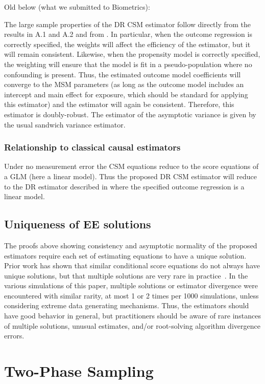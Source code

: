\documentclass[12pt]{article}
\begin{document}
Old below (what we submitted to Biometrics):

The large sample properties of the DR CSM estimator follow directly from the results in A.1 and A.2 and from \citet{kang2007}. In particular, when the outcome regression is correctly specified, the weights will affect the efficiency of the estimator, but it will remain consistent. Likewise, when the propensity model is correctly specified, the weighting will ensure that the model is fit in a pseudo-population where no confounding is present. Thus, the estimated outcome model coefficients will converge to the MSM parameters (as long as the outcome model includes an intercept and main effect for exposure, which should be standard for applying this estimator) and the estimator will again be consistent. Therefore, this estimator is doubly-robust. The estimator of the asymptotic variance is given by the usual sandwich variance estimator.

\subsubsection{Relationship to classical causal estimators}

Under no measurement error the CSM equations reduce to the score equations of a GLM (here a linear model). Thus the proposed DR CSM estimator will reduce to the DR estimator described in \citet{kang2007} where the specified outcome regression is a linear model.

\subsection{Uniqueness of EE solutions}

The proofs above showing consistency and asymptotic normality of the proposed estimators require each set of estimating equations to have a unique solution. Prior work has shown that similar conditional score equations do not always have unique solutions, but that multiple solutions are very rare in practice~\citep{stefanski1987}. In the various simulations of this paper, multiple solutions or estimator divergence were encountered with similar rarity, at most 1 or 2 times per 1000 simulations, unless considering extreme data generating mechanisms. Thus, the estimators should have good behavior in general, but practitioners should be aware of rare instances of multiple solutions, unusual estimates, and/or root-solving algorithm divergence errors.

\section{Two-Phase Sampling}
\end{document}
